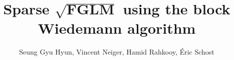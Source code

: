 \documentclass[final]{beamer}
\title{Sparse 
	$\mathbf{\sqrt{FGLM}}$ using the block Wiedemann algorithm} %
\author{Seung Gyu Hyun, Vincent Neiger, Hamid Rahkooy, \'Eric Schost} %
\institute{University of Waterloo, DTU Compute} %
\newlength{\sepwid}
\newlength{\onecolwid}
\begin{document}

\setlength{\belowcaptionskip}{2ex} %
\setlength\belowdisplayshortskip{2ex} %

\begin{frame}[t] %

\begin{columns}[t] %

\begin{column}{\sepwid}\end{column} %

\begin{column}{\onecolwid} %







\end{column}
\end{columns}
\end{frame}
\end{document}
